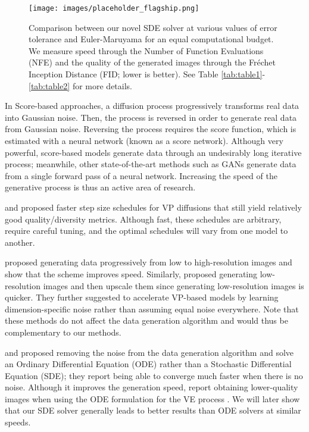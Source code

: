 \documentclass{article}
\begin{document}
\begin{figure}[H] \centering
    \texttt{[image: images/placeholder\_flagship.png]}
    \caption{Comparison between our novel SDE solver at various values of error tolerance and Euler-Maruyama for an equal computational budget. We measure speed through the Number of Function Evaluations (NFE) and the quality of the generated images through the Fréchet Inception Distance (FID; lower is better). See Table \ref{tab:table1}-\ref{tab:table2} for more details.} 
  \label{fig:flagship} 
\end{figure}



In Score-based approaches, a diffusion process progressively transforms real data into Gaussian noise. Then, the process is reversed in order to generate real data from Gaussian noise. Reversing the process requires the score function, which is estimated with a neural network (known as a score network). Although very powerful, score-based models generate data through an undesirably long iterative process; meanwhile, other state-of-the-art methods such as GANs generate data from a single forward pass of a neural network. Increasing the speed of the generative process is thus an active area of research.


\citet{chen2020wavegrad} and \citet{san2021noise} proposed faster step size schedules for VP diffusions that still yield relatively good quality/diversity metrics. Although fast, these schedules are arbitrary, require careful tuning, and the optimal schedules will vary from one model to another.

\citet{block2020fast} proposed generating data progressively from low to high-resolution images and show that the scheme improves speed. Similarly, \citet{nichol2021improved} proposed generating low-resolution images and then upscale them since generating low-resolution images is quicker. They further suggested to accelerate VP-based models by learning dimension-specific noise rather than assuming equal noise everywhere.
Note that these methods do not affect the data generation algorithm and would thus be complementary to our methods.

\citet{song2020score} and \citet{song2020denoising} proposed removing the noise from the data generation algorithm and solve an Ordinary Differential Equation (ODE) rather than a Stochastic Differential Equation (SDE); they report being able to converge much faster when there is no noise. Although it improves the generation speed, \citet{song2020score} report obtaining lower-quality images when using the ODE formulation for the VE process \citep{song2020score}. We will later show that our SDE solver generally leads to better results than ODE solvers at similar speeds.
\end{document}
